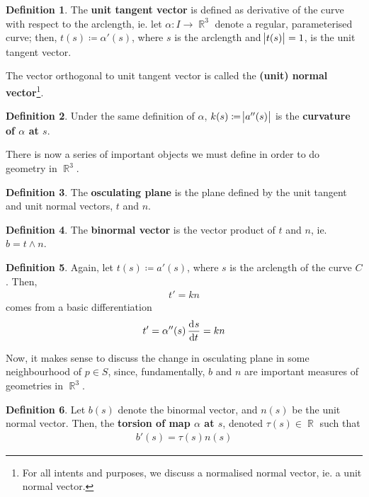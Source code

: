 \documentclass{amsart} %
\theoremstyle{mytheoremstyle}
\theoremstyle{definition}
\newtheorem{definition}{Definition}[section]
\numberwithin{equation}{section}
\DeclareMathOperator{\R}{\mathbb{R}}
\DeclareMathOperator{\1}{\mathbbm{1}}
\begin{document}
\begin{definition}
	\label{defunittangentvector}
	The \textbf{unit tangent vector} is defined as derivative of the curve with respect to the arclength, ie. let $\alpha: I \to \R^3$ denote a regular, parameterised curve; then, $t(s) \coloneqq \alpha'(s)$, where $s$ is the arclength and $\abs{t(s)} = 1$, is the unit tangent vector.
	
	The vector orthogonal to unit tangent vector is called the \textbf{(unit) normal vector}\footnote{For all intents and purposes, we discuss a normalised normal vector, ie. a unit normal vector.}.
\end{definition}

\begin{definition}
	\label{defcurvature}
	Under the same definition of $\alpha$, $k(s) \coloneqq \abs{a''(s)}$ is the \textbf{curvature of $\alpha$ at $s$}.
\end{definition}

There is now a series of important objects we must define in order to do geometry in $\R^3$.

\begin{definition}
	\label{defosculatingplane}
	The \textbf{osculating plane} is the plane defined by the unit tangent and unit normal vectors, $t$ and $n$.
\end{definition}

\begin{definition}
	\label{defbinormalvector}
	The \textbf{binormal vector} is the vector product of $t$ and $n$, ie. $b = t \wedge n$.
\end{definition}

\begin{definition}
	Again, let $t(s) \coloneqq a'(s)$, where $s$ is the arclength of the curve $C$. Then,
	\begin{align}
		\label{eqfrenett'}
		t' = kn
	\end{align}
	comes from a basic differentiation
	\begin{align*}
		t' = \alpha''(s) \dod{s}{t} = kn
	\end{align*}
\end{definition}


Now, it makes sense to discuss the change in osculating plane in some neighbourhood of $p \in S$, since, fundamentally, $b$ and $n$ are important measures of geometries in $\R^3$.

\begin{definition}
	\label{deftorsion}
	Let $b(s)$ denote the binormal vector, and $n(s)$ be the unit normal vector. Then, the \textbf{torsion of map $\alpha$ at $s$}, denoted $\tau(s) \in \R$ such that
	\begin{align}
		\label{eqfrenetb'}
		b'(s) = \tau(s) n(s)
	\end{align}
\end{definition}
\end{document}
